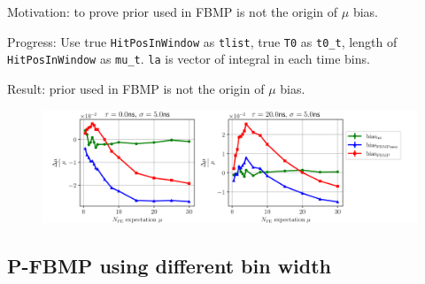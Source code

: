 \documentclass[notitlepage]{article}
\begin{document}
Motivation: to prove prior used in FBMP is not the origin of $\mu$ bias. 

Progress: Use true \texttt{HitPosInWindow} as \texttt{tlist}, true \texttt{T0} as \texttt{t0\_t}, length of \texttt{HitPosInWindow} as \texttt{mu\_t}. \texttt{la} is vector of integral in each time bins. 

Result: prior used in FBMP is not the origin of $\mu$ bias. 

\begin{figure}[H]
    \includegraphics[width=\textwidth]{vs-biasmu-truprior.png}
\end{figure}

\subsection{P-FBMP using different bin width}
\end{document}
